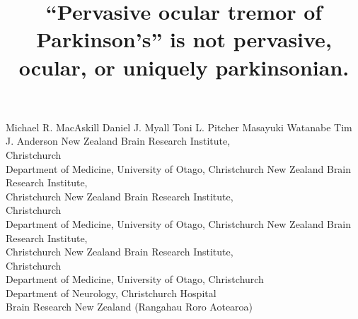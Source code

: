 \documentclass[jou,a4paper]{apa6}
\begin{document}
\newcommand{\jemrVolume}{x}
\newcommand{\jemrIssue}{y}
\newcommand{\jemrArticle}{z}
\newcommand{\jemrLastPage}{\pageref{LastPage}}
\newcommand{\jemrReceivedDate}{Mmm dd, 2016}
\newcommand{\jemrPublishedDate}{Mmm dd, 2016}
\newcommand{\jemrShortTitle}{``Ocular tremor'' in Parkinson's disease}


\title{``Pervasive ocular tremor of Parkinson's'' is not pervasive, ocular, or uniquely parkinsonian.}
\fiveauthors
	{Michael R. MacAskill}
	{Daniel J. Myall}
	{Toni L. Pitcher}
	{Masayuki Watanabe}
	{Tim J. Anderson}
\fiveaffiliations
    {New Zealand Brain Research Institute,\\Christchurch\\
    Department of Medicine, University of Otago, Christchurch}
    {New Zealand Brain Research Institute,\\Christchurch}
    {New Zealand Brain Research Institute,\\Christchurch\\
    Department of Medicine, University of Otago, Christchurch}
	{New Zealand Brain Research Institute,\\Christchurch}
    {New Zealand Brain Research Institute,\\Christchurch\\
    Department of Medicine, University of Otago, Christchurch\\
    Department of Neurology, Christchurch Hospital\\
    Brain Research New Zealand (Rangahau Roro Aotearoa)}
\end{document}
